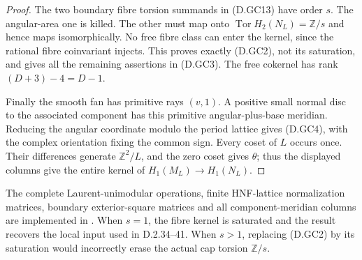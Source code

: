 \begin{proof}
The two boundary fibre torsion summands in
(D.GC13) have order $s$. The angular-area
one is killed. The other must map onto
$\operatorname{Tor}H_2(N_L)=\mathbb Z/s$ and
hence maps isomorphically. No free fibre
class can enter the kernel, since the rational
fibre coinvariant injects. This proves exactly
(D.GC2), not its saturation, and gives all
the remaining assertions in (D.GC3).
The free cokernel has rank $(D+3)-4=D-1$.

Finally the smooth fan has primitive rays
$(v,1)$. A positive small normal disc to
the associated component has this primitive
angular-plus-base meridian. Reducing the
angular coordinate modulo the period lattice
gives (D.GC4), with the complex orientation
fixing the common sign. Every coset of $L$
occurs once. Their differences generate
$\mathbb Z^2/L$, and the zero coset gives
$\theta$; thus the displayed columns give
the entire kernel of $H_1(M_L)\to H_1(N_L)$.
\end{proof}

The complete Laurent-unimodular operations,
finite HNF-lattice normalization matrices,
boundary exterior-square matrices and all
component-meridian columns are implemented in
.
When $s=1$, the fibre kernel is saturated
and the result recovers the local input used
in D.2.34--41. When $s>1$, replacing (D.GC2)
by its saturation would incorrectly erase
the actual cap torsion $\mathbb Z/s$.
